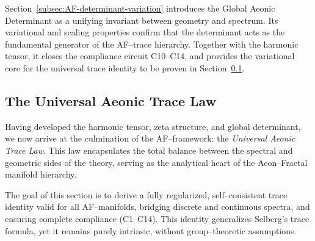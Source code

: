 
\begin{remark}
Section~\ref{subsec:AF-determinant-variation}
introduces the Global Aeonic Determinant
as a unifying invariant between geometry and spectrum.
Its variational and scaling properties confirm that
the determinant acts as the fundamental generator
of the AF–trace hierarchy.
Together with the harmonic tensor,
it closes the compliance circuit C10–C14,
and provides the variational core for the universal trace identity
to be proven in Section~\ref{subsec:AF-global-trace-law}.
\end{remark}


\subsection{The Universal Aeonic Trace Law}
\label{subsec:AF-global-trace-law}
\relax \hspace{0pt}


Having developed the harmonic tensor, zeta structure, and global determinant,
we now arrive at the culmination of the AF–framework:
the \emph{Universal Aeonic Trace Law}.
This law encapsulates the total balance between the spectral
and geometric sides of the theory, serving as the analytical heart
of the Aeon–Fractal manifold hierarchy.

The goal of this section is to derive a fully regularized, self–consistent
trace identity valid for all AF–manifolds,
bridging discrete and continuous spectra,
and ensuring complete compliance (C1–C14).
This identity generalizes Selberg’s trace formula,
yet it remains purely intrinsic, without group–theoretic assumptions.

